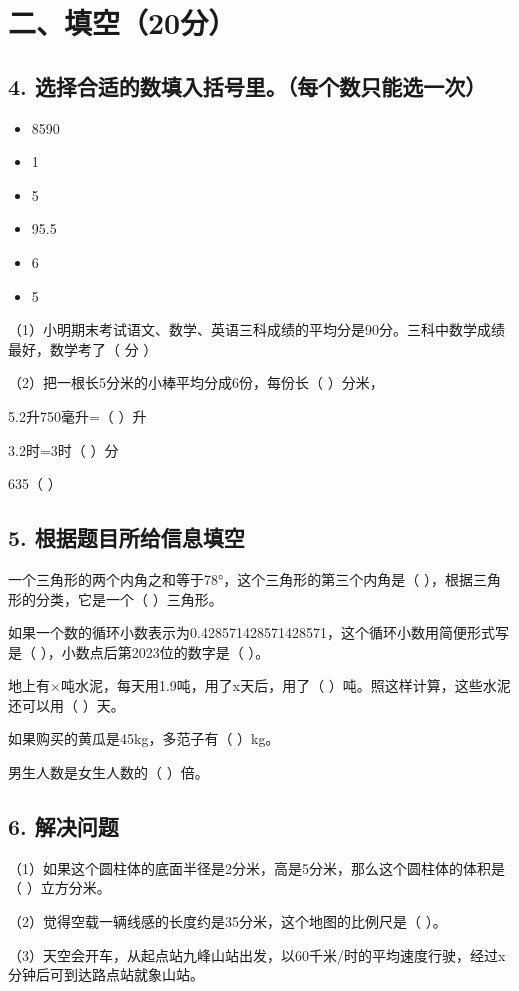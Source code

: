 \documentclass[12pt]{article}
\begin{document}
\section*{二、填空（20分）}
\subsection*{4. 选择合适的数填入括号里。（每个数只能选一次）}
\begin{itemize}
    \item 8590
    \item 1
    \item 5
    \item 95.5
    \item 6
    \item 5
\end{itemize}
（1）小明期末考试语文、数学、英语三科成绩的平均分是90分。三科中数学成绩最好，数学考了（ 分 ）

（2）把一根长5分米的小棒平均分成6份，每份长（ ）分米，

5.2升750毫升=（ ）升

3.2时=3时（ ）分

635（ ）%

\subsection*{5. 根据题目所给信息填空}
一个三角形的两个内角之和等于78°，这个三角形的第三个内角是（ ），根据三角形的分类，它是一个（ ）三角形。

如果一个数的循环小数表示为0.428571428571428571，这个循环小数用简便形式写是（ ），小数点后第2023位的数字是（ ）。

地上有×吨水泥，每天用1.9吨，用了x天后，用了（ ）吨。照这样计算，这些水泥还可以用（ ）天。

如果购买的黄瓜是45kg，多范子有（ ）kg。

男生人数是女生人数的（ ）倍。

\subsection*{6. 解决问题}
（1）如果这个圆柱体的底面半径是2分米，高是5分米，那么这个圆柱体的体积是（ ）立方分米。

（2）觉得空载一辆线感的长度约是35分米，这个地图的比例尺是（ ）。

（3）天空会开车，从起点站九峰山站出发，以60千米/时的平均速度行驶，经过x分钟后可到达路点站就象山站。
\end{document}
